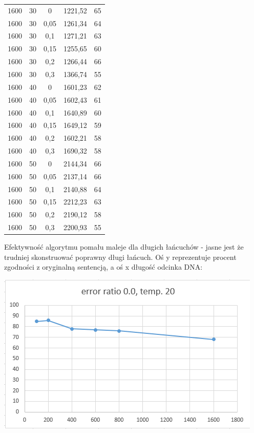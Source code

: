 \documentclass{article}
\begin{document}
\begin{longtable}{c|c|c|c|c}
1600   & 30   & 0     & 1221,52 & 65    \\
1600   & 30   & 0,05  & 1261,34 & 64    \\
1600   & 30   & 0,1   & 1271,21 & 63    \\
1600   & 30   & 0,15  & 1255,65 & 60    \\
1600   & 30   & 0,2   & 1266,44 & 66    \\
1600   & 30   & 0,3   & 1366,74 & 55    \\
1600   & 40   & 0     & 1601,23 & 62    \\
1600   & 40   & 0,05  & 1602,43 & 61    \\
1600   & 40   & 0,1   & 1640,89 & 60    \\
1600   & 40   & 0,15  & 1649,12 & 59    \\
1600   & 40   & 0,2   & 1602,21 & 58    \\
1600   & 40   & 0,3   & 1690,32 & 58    \\
1600   & 50   & 0     & 2144,34 & 66    \\
1600   & 50   & 0,05  & 2137,14 & 66    \\
1600   & 50   & 0,1   & 2140,88 & 64    \\
1600   & 50   & 0,15  & 2212,23 & 63    \\
1600   & 50   & 0,2   & 2190,12 & 58    \\
1600   & 50   & 0,3   & 2200,93 & 55   
\end{longtable}

Efektywność algorytmu pomału maleje dla długich łańcuchów - jasne jest że trudniej skonstruować poprawny długi łańcuch. Oś y reprezentuje procent zgodności z oryginalną sentencją, a oś x długość odcinka DNA:


\includegraphics{temp20err000}
\end{document}
